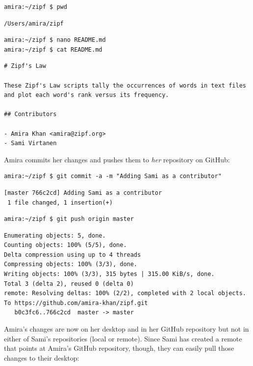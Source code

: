 \documentclass[
]{krantz}
\begin{document}
\begin{verbatim}
amira:~/zipf $ pwd
\end{verbatim}

\begin{verbatim}
/Users/amira/zipf
\end{verbatim}

\begin{verbatim}
amira:~/zipf $ nano README.md
amira:~/zipf $ cat README.md
\end{verbatim}

\begin{verbatim}
# Zipf's Law

These Zipf's Law scripts tally the occurrences of words in text files
and plot each word's rank versus its frequency.

## Contributors

- Amira Khan <amira@zipf.org>
- Sami Virtanen
\end{verbatim}

Amira commits her changes and pushes them to \emph{her} repository on GitHub:

\begin{verbatim}
amira:~/zipf $ git commit -a -m "Adding Sami as a contributor"
\end{verbatim}

\begin{verbatim}
[master 766c2cd] Adding Sami as a contributor
 1 file changed, 1 insertion(+)
\end{verbatim}

\begin{verbatim}
amira:~/zipf $ git push origin master
\end{verbatim}

\begin{verbatim}
Enumerating objects: 5, done.
Counting objects: 100% (5/5), done.
Delta compression using up to 4 threads
Compressing objects: 100% (3/3), done.
Writing objects: 100% (3/3), 315 bytes | 315.00 KiB/s, done.
Total 3 (delta 2), reused 0 (delta 0)
remote: Resolving deltas: 100% (2/2), completed with 2 local objects.
To https://github.com/amira-khan/zipf.git
   b0c3fc6..766c2cd  master -> master
\end{verbatim}

Amira's changes are now on her desktop and in her GitHub repository
but not in either of Sami's repositories (local or remote).
Since Sami has created a remote that points at Amira's GitHub repository,
though,
they can easily pull those changes to their desktop:
\end{document}
